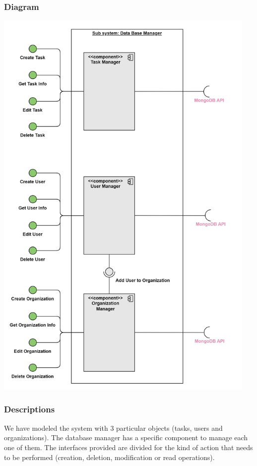 \documentclass{article}
\begin{document}
\subsubsection{Diagram}
\begin{center}
\includegraphics[width=5in,height=\textheight,keepaspectratio]{images/component_diagram/data_base_manager.jpg}
\end{center}
\subsubsection{Descriptions}

We have modeled the system with 3 particular objects (tasks, users and organizations).
The database manager has a specific component to manage each one of them. The interfaces provided
are divided for the kind of action that needs to be performed (creation, deletion, modification or read operations).
\end{document}
